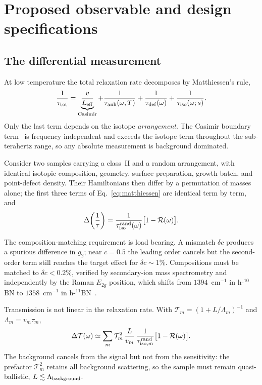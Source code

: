 \documentclass[
  aps,
  prl,
  reprint,
  amsmath,
  amssymb,
  superscriptaddress,
  floatfix,
  nofootinbib
]{revtex4-2}
\newcommand{\tenB}{$^{10}$B}
\newcommand{\elevenB}{$^{11}$B}
\newcommand{\Tr}{\mathcal{T}}
\begin{document}
\section{Proposed observable and design specifications}
\label{sec:observable}

\subsection{The differential measurement}

At low temperature the total relaxation rate decomposes by Matthiessen's rule,
\begin{equation}
  \frac{1}{\tau_{\rm tot}}
    = \underbrace{\frac{v}{L_{\rm eff}}}_{\rm Casimir}
    + \frac{1}{\tau_{\rm anh}(\omega,T)}
    + \frac{1}{\tau_{\rm def}(\omega)}
    + \frac{1}{\tau_{\rm iso}(\omega;s)} .
  \label{eq:matthiessen}
\end{equation}
Only the last term depends on the isotope \emph{arrangement}. The Casimir
boundary term~\cite{Casimir1938,Ziman1960} is frequency independent and exceeds the isotope term throughout the
sub-terahertz range, so any absolute measurement is background dominated.

Consider two samples carrying a class~II and a random arrangement, with
identical isotopic composition, geometry, surface preparation, growth batch,
and point-defect density. Their Hamiltonians then differ by a permutation of
masses alone; the first three terms of Eq.~\eqref{eq:matthiessen} are
identical term by term, and
\begin{equation}
  \Delta\!\left(\frac{1}{\tau}\right)
    = \frac{1}{\tau_{\rm iso}^{\rm rand}(\omega)}\big[1-\mathcal{R}(\omega)\big].
  \label{eq:diffrate}
\end{equation}

The composition-matching requirement is load bearing. A mismatch $\delta c$
produces a spurious difference in $g_2$; near $c=0.5$ the leading order
cancels but the second-order term still reaches the target effect for
$\delta c\sim1\%$. Compositions must be matched to $\delta c<0.2\%$, verified
by secondary-ion mass spectrometry and independently by the Raman $E_{2g}$
position, which shifts from $1394$~cm$^{-1}$ in h-\tenB N to $1358$~cm$^{-1}$
in h-\elevenB N~\cite{Vuong2018}.

Transmission is not linear in the relaxation rate. With
$\Tr_m=(1+L/\Lambda_m)^{-1}$ and $\Lambda_m=v_m\tau_m$,
\begin{equation}
  \Delta\Tr(\omega)\simeq\sum_m \Tr_m^{2}\,\frac{L}{v_m}\,
    \frac{1}{\tau_{{\rm iso},m}^{\rm rand}}\big[1-\mathcal{R}(\omega)\big].
  \label{eq:dT}
\end{equation}
The background cancels from the signal but not from the sensitivity: the
prefactor $\Tr_m^{2}$ retains all background scattering, so the sample must
remain quasi-ballistic, $L\lesssim\Lambda_{\rm background}$.
\end{document}
